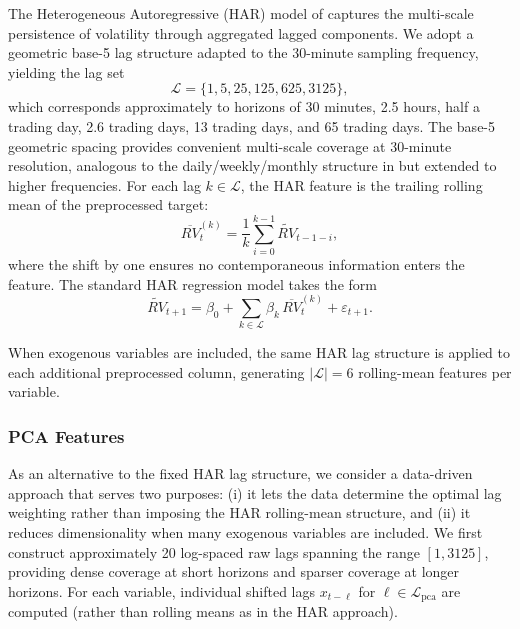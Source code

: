 The Heterogeneous Autoregressive (HAR) model of \citet{Corsi2009} captures the multi-scale persistence of volatility through aggregated lagged components. We adopt a geometric base-5 lag structure adapted to the 30-minute sampling frequency, yielding the lag set
\begin{equation}
    \mathcal{L} = \{1, 5, 25, 125, 625, 3125\},
    \label{eq:har_lags}
\end{equation}
which corresponds approximately to horizons of 30 minutes, 2.5 hours, half a trading day, 2.6 trading days, 13 trading days, and 65 trading days. The base-5 geometric spacing provides convenient multi-scale coverage at 30-minute resolution, analogous to the daily/weekly/monthly structure in \citet{Corsi2009} but extended to higher frequencies. For each lag $k \in \mathcal{L}$, the HAR feature is the trailing rolling mean of the preprocessed target:
\begin{equation}
    \overline{RV}_t^{(k)} = \frac{1}{k}\sum_{i=0}^{k-1} \widetilde{RV}_{t-1-i},
    \label{eq:har_ma}
\end{equation}
where the shift by one ensures no contemporaneous information enters the feature. The standard HAR regression model takes the form
\begin{equation}
    \widetilde{RV}_{t+1} = \beta_0 + \sum_{k \in \mathcal{L}} \beta_k \, \overline{RV}_t^{(k)} + \varepsilon_{t+1}.
    \label{eq:har_model}
\end{equation}

When exogenous variables are included, the same HAR lag structure is applied to each additional preprocessed column, generating $|\mathcal{L}| = 6$ rolling-mean features per variable.

\subsubsection{PCA Features}
\label{sec:pca_features}

As an alternative to the fixed HAR lag structure, we consider a data-driven approach that serves two purposes: (i) it lets the data determine the optimal lag weighting rather than imposing the HAR rolling-mean structure, and (ii) it reduces dimensionality when many exogenous variables are included. We first construct approximately 20 log-spaced raw lags spanning the range $[1, 3125]$, providing dense coverage at short horizons and sparser coverage at longer horizons. For each variable, individual shifted lags $x_{t-\ell}$ for $\ell \in \mathcal{L}_{\mathrm{pca}}$ are computed (rather than rolling means as in the HAR approach).

